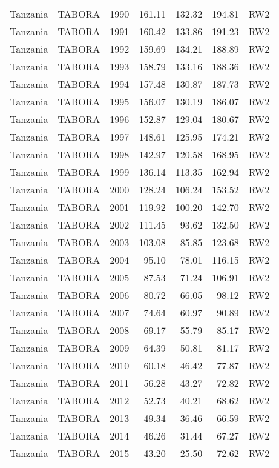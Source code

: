 \begin{longtable}{lllrrrl}
  Tanzania & TABORA & 1990 & 161.11 & 132.32 & 194.81 & RW2 \\ 
  Tanzania & TABORA & 1991 & 160.42 & 133.86 & 191.23 & RW2 \\ 
  Tanzania & TABORA & 1992 & 159.69 & 134.21 & 188.89 & RW2 \\ 
  Tanzania & TABORA & 1993 & 158.79 & 133.16 & 188.36 & RW2 \\ 
  Tanzania & TABORA & 1994 & 157.48 & 130.87 & 187.73 & RW2 \\ 
  Tanzania & TABORA & 1995 & 156.07 & 130.19 & 186.07 & RW2 \\ 
  Tanzania & TABORA & 1996 & 152.87 & 129.04 & 180.67 & RW2 \\ 
  Tanzania & TABORA & 1997 & 148.61 & 125.95 & 174.21 & RW2 \\ 
  Tanzania & TABORA & 1998 & 142.97 & 120.58 & 168.95 & RW2 \\ 
  Tanzania & TABORA & 1999 & 136.14 & 113.35 & 162.94 & RW2 \\ 
  Tanzania & TABORA & 2000 & 128.24 & 106.24 & 153.52 & RW2 \\ 
  Tanzania & TABORA & 2001 & 119.92 & 100.20 & 142.70 & RW2 \\ 
  Tanzania & TABORA & 2002 & 111.45 & 93.62 & 132.50 & RW2 \\ 
  Tanzania & TABORA & 2003 & 103.08 & 85.85 & 123.68 & RW2 \\ 
  Tanzania & TABORA & 2004 & 95.10 & 78.01 & 116.15 & RW2 \\ 
  Tanzania & TABORA & 2005 & 87.53 & 71.24 & 106.91 & RW2 \\ 
  Tanzania & TABORA & 2006 & 80.72 & 66.05 & 98.12 & RW2 \\ 
  Tanzania & TABORA & 2007 & 74.64 & 60.97 & 90.89 & RW2 \\ 
  Tanzania & TABORA & 2008 & 69.17 & 55.79 & 85.17 & RW2 \\ 
  Tanzania & TABORA & 2009 & 64.39 & 50.81 & 81.17 & RW2 \\ 
  Tanzania & TABORA & 2010 & 60.18 & 46.42 & 77.87 & RW2 \\ 
  Tanzania & TABORA & 2011 & 56.28 & 43.27 & 72.82 & RW2 \\ 
  Tanzania & TABORA & 2012 & 52.73 & 40.21 & 68.62 & RW2 \\ 
  Tanzania & TABORA & 2013 & 49.34 & 36.46 & 66.59 & RW2 \\ 
  Tanzania & TABORA & 2014 & 46.26 & 31.44 & 67.27 & RW2 \\ 
  Tanzania & TABORA & 2015 & 43.20 & 25.50 & 72.62 & RW2 \\ 

\end{longtable}
